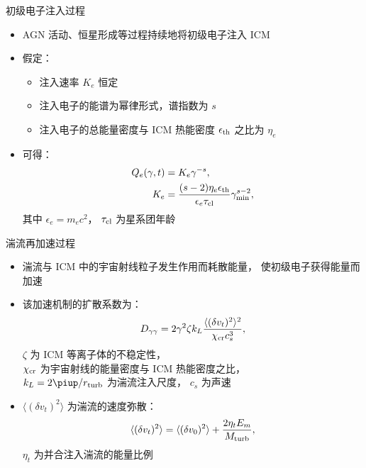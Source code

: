 \documentclass{beamer}
\begin{document}
\begin{frame}
  \begin{alertblock}{初级电子注入过程}
    \smallskip
    \begin{itemize}
      \item AGN 活动、恒星形成等过程持续地将初级电子注入 ICM
      \item 假定：
        \begin{itemize}
          \item 注入速率 $K_e$ 恒定
          \item 注入电子的能谱为幂律形式，谱指数为 $s$
          \item 注入电子的总能量密度与 ICM 热能密度 $\epsilon_{\text{th}}$
            之比为 $\eta_e$
        \end{itemize}
      \item 可得：
        \begin{align}
          Q_e(\gamma, t) & = K_e \gamma^{-s} , \\
          K_e & = \frac{(s-2) \eta_e \epsilon_{\text{th}}}{
            \epsilon_e \tau_{\text{cl}}} \gamma_{\text{min}}^{s-2} ,
        \end{align}
        其中 $\epsilon_e = m_e c^2$，
        $\tau_{\text{cl}}$ 为星系团年龄
    \end{itemize}
  \end{alertblock}
\end{frame}

\begin{frame}
  \vspace{1ex}
  \begin{alertblock}{湍流再加速过程}
    \smallskip
    \begin{itemize}
      \item 湍流与 ICM 中的宇宙射线粒子发生作用而耗散能量，
        使初级电子获得能量而加速
      \item 该加速机制的扩散系数为：
        \begin{equation}
          D_{\gamma\gamma} =
            2 \gamma^2 \zeta k_L
            \frac{\langle (\delta v_t)^2 \rangle^2}{\chi_{\text{cr}} c_s^3} ,
        \end{equation}
        $\zeta$ 为 ICM 等离子体的不稳定性，\\
        $\chi_{\text{cr}}$ 为宇宙射线的能量密度与 ICM 热能密度之比，\\
        $k_L = 2\Cpi / r_{\R{turb}}$ 为湍流注入尺度，
        $c_s$ 为声速
      \item $\langle (\delta v_t)^2 \rangle$ 为湍流的速度弥散：
        \begin{equation}
          \langle (\delta v_t)^2 \rangle =
            \langle (\delta v_0)^2 \rangle +
            \frac{2 \eta_t E_m}{M_{\text{turb}}} ,
        \end{equation}
        $\eta_t$ 为并合注入湍流的能量比例
    \end{itemize}
  \end{alertblock}
\end{frame}
\end{document}
